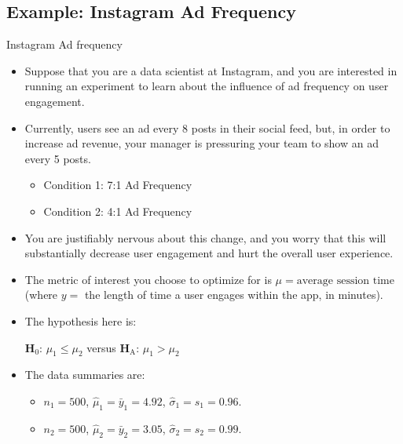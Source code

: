 \subsection{Example: Instagram Ad Frequency}
\begin{Example}{Instagram Ad frequency}{}
      \begin{itemize}
            \item Suppose that you are a data scientist at Instagram, and you are interested
                  in running an experiment to learn about the influence of ad frequency on user engagement.
            \item Currently, users see an ad every 8 posts in their social feed, but, in order
                  to increase ad revenue, your manager is pressuring your team to show an ad every 5 posts.
                  \begin{itemize}
                        \item Condition 1: 7:1 Ad Frequency
                        \item Condition 2: 4:1 Ad Frequency
                  \end{itemize}
            \item You are justifiably nervous about this change, and you worry that this
                  will substantially decrease user engagement and hurt the overall user experience.
            \item The metric of interest you choose to optimize for is $ \mu=\text{average session time} $
                  (where $ y =$ the length of time a user engages within the app, in minutes).
            \item The hypothesis here is:
                  \begin{tightcenter}
                        $ \mathbf{H}_0 $: $ \mu_1\le \mu_2 $ versus $ \mathbf{H}_\text{A} $: $ \mu_1>\mu_2 $
                  \end{tightcenter}
            \item The data summaries are:
                  \begin{itemize}
                        \item $ n_1=500 $, $ \hat{\mu}_1=\bar{y}_1=4.92 $, $ \hat{\sigma}_1=s_1=0.96 $.
                        \item $ n_2=500 $, $ \hat{\mu}_2=\bar{y}_2=3.05 $, $ \hat{\sigma}_2=s_2=0.99 $.
                  \end{itemize}
      \end{itemize}
      \begin{framed}

\end{framed}
\end{Example}
